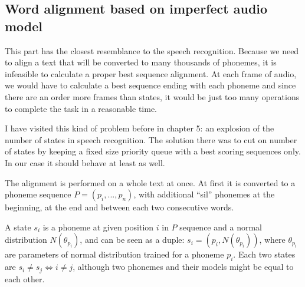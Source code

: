 \documentclass[12pt,a4paper,english]{article}
\begin{document}
\newpage
\subsection{Word alignment based on imperfect audio model}

This part has the closest resemblance to the speech recognition. Because we need to align a text that will be converted to many thousands of phonemes, it is infeasible to calculate a proper best sequence alignment. At each frame of audio, we would have to calculate a best sequence ending with each phoneme and since there are an order more frames than states, it would be just too many operations to complete the task in a reasonable time. \newline

I have visited this kind of problem before in chapter 5: an explosion of the number of states in speech recognition. The solution there was to cut on number of states by keeping a fixed size priority queue with a best scoring sequences only. In our case it should behave at least as well. \newline

The alignment is performed on a whole text at once. At first it is converted to a phoneme sequence $P = (p_i, ..., p_n)$, with additional “sil” phonemes at the beginning, at the end and between each two consecutive words. \newline

A state $s_i$ is a phoneme at given position $i$ in $P$ sequence and a normal distribution $N(\theta_{p_i})$,
and can be seen as a duple: $s_i = (p_i, N(\theta_{p_i}))$, where $\theta_{p_i}$ are parameters of normal distribution trained for a phoneme $p_i$. \newline
Each two states are $s_i \neq s_j \iff i \neq j$, although two phonemes and their models might be equal to each other. \newline
\end{document}
